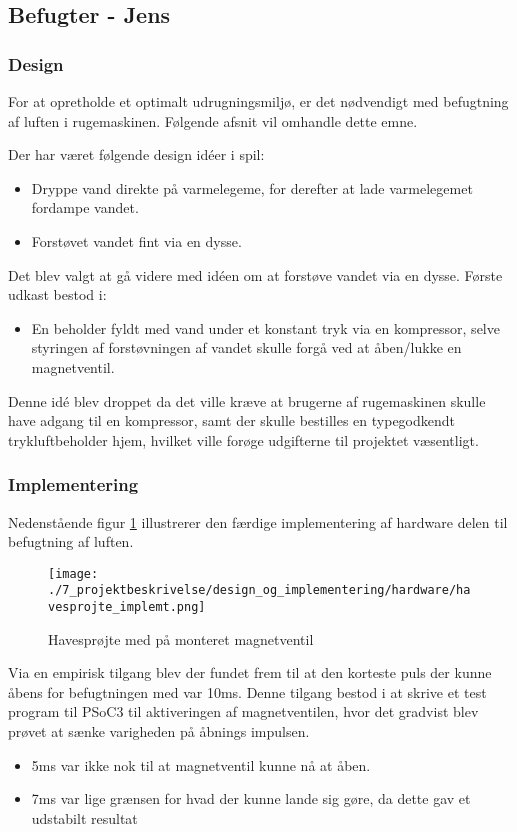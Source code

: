 \newpage
\subsection{Befugter - Jens}
\subsubsection{Design}
For at opretholde et optimalt udrugningsmiljø, er det nødvendigt med befugtning af luften i rugemaskinen. Følgende afsnit vil omhandle dette emne.

Der har været følgende design idéer i spil:

\begin{itemize}
  \item  Dryppe vand direkte på varmelegeme, for derefter at lade varmelegemet fordampe vandet.
  \item Forstøvet vandet fint via en dysse.
\end{itemize}
 
Det blev valgt at gå videre med idéen om at forstøve vandet via en dysse.
 Første udkast bestod i:
\begin{itemize}
	\item En beholder fyldt med vand under et konstant tryk via en kompressor, selve styringen af forstøvningen af vandet skulle forgå ved at åben/lukke en magnetventil.
\end{itemize} 
Denne idé blev droppet da det ville kræve at brugerne af rugemaskinen skulle have adgang til en kompressor, samt der skulle bestilles en typegodkendt trykluftbeholder hjem, hvilket ville forøge udgifterne til projektet væsentligt.
\subsubsection{Implementering}

Nedenstående figur \ref{fig:Havesprojte_implement_rapport} illustrerer den færdige implementering af hardware delen til befugtning af luften. 

\begin{figure}[H]
\centering
{\texttt{[image: ./7\_projektbeskrivelse/design\_og\_implementering/hardware/havesprojte\_implemt.png]}}
\caption[Figur]{Havesprøjte med på monteret magnetventil}
\label{fig:Havesprojte_implement_rapport}
\end{figure}

Via en empirisk tilgang blev der fundet frem til at den korteste puls der kunne åbens for befugtningen med var 10ms. Denne tilgang bestod i at skrive et test program til PSoC3 til aktiveringen af magnetventilen, hvor det gradvist blev prøvet at sænke varigheden på åbnings impulsen. 
\begin{itemize}
\item 5ms var ikke nok til at magnetventil kunne nå at åben.
\item 7ms var lige grænsen for hvad der kunne lande sig gøre, da dette gav et udstabilt resultat 
\end{itemize}